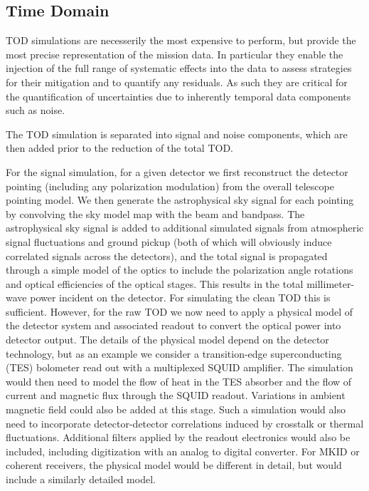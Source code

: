 \subsection{Time Domain}

TOD simulations are necesserily the most expensive to perform, but provide the most precise representation of the mission data. In particular they enable the injection of the full range of systematic effects into the data to assess strategies for their mitigation and to quantify any residuals. As such they are critical for the quantification of uncertainties due to inherently temporal data components such as noise.

The TOD simulation is separated into signal and noise components, which are then added prior to the reduction of the total TOD.

For the signal simulation, for a given detector we first reconstruct the detector pointing (including any polarization modulation) from the overall telescope pointing model. We then generate the astrophysical sky signal for each pointing by convolving the sky model map with the beam and bandpass. The astrophysical sky signal is added to additional simulated signals from atmospheric signal fluctuations and ground pickup (both of which will obviously induce correlated signals across the detectors), and the total signal is propagated through a simple model of the optics to include the polarization angle rotations and optical efficiencies of the optical stages. This results in the total millimeter-wave power incident on the detector. For simulating the clean TOD this is sufficient. However, for the raw TOD we now need to apply a physical model of the detector system and associated readout to convert the optical power into detector output. The details of the physical model depend on the detector technology, but as an example we consider a transition-edge superconducting (TES) bolometer read out with a multiplexed SQUID amplifier. The simulation would then need to model the flow of heat in the TES absorber and the flow of current and magnetic flux through the SQUID readout. Variations in ambient magnetic field could also be added at this stage. Such a simulation would also need to incorporate detector-detector correlations induced by crosstalk or thermal fluctuations.  Additional filters applied by the readout electronics would also be included, including digitization with an analog to digital converter. For MKID or coherent receivers, the physical model would be different in detail, but would include a similarly detailed model.

